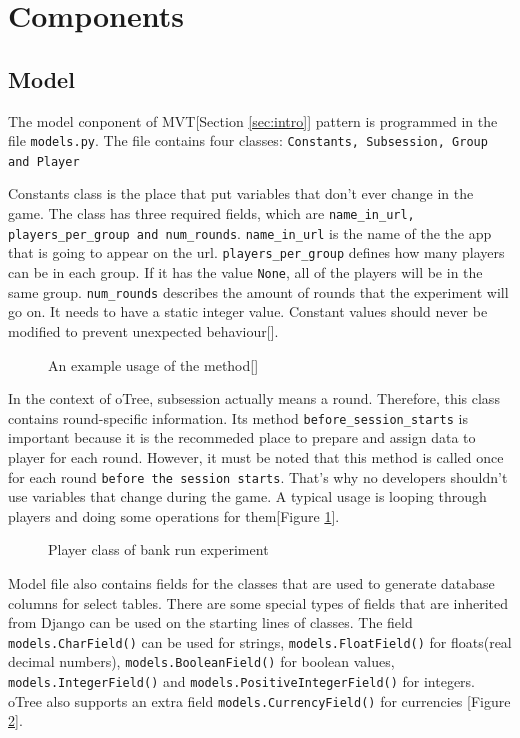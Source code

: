 \section{Components}

\subsection{Model}

The model conponent of MVT[Section \ref{sec:intro}] pattern is programmed in the file \verb|models.py|. The file contains four classes: \verb|Constants, Subsession, Group and Player| 

Constants class is the place that put variables that don't ever change in the game. The class has three required fields, which are \verb|name_in_url, players_per_group and num_rounds|. \verb|name_in_url| is the name of the the app that is going to appear on the url. \verb|players_per_group| defines how many players can be in each group. If it has the value \verb|None|, all of the players will be in the same group. \verb|num_rounds| describes the amount of rounds that the experiment will go on. It needs to have a static integer value. Constant values should never be modified to prevent unexpected behaviour[\cite{oTreeModel2017}]. 

\begin{figure}[h]
	\centerline{}
	\caption{An example usage of the method[\cite{oTreeModel2017}]}
	\label{fig:picture7}
	
\end{figure}

In the context of oTree, subsession actually means a round. Therefore, this class contains round-specific information. Its method \verb|before_session_starts| is important because it is the recommeded place to prepare and assign data to  player for each round. However, it must be noted that this method is called once for each round \verb|before the session starts|. That's why no developers shouldn't use variables that change during the game.  A typical usage is looping through players and doing some operations for them[Figure \ref{fig:picture7}].

\begin{figure}[h]
	\centerline{}
	\caption{Player class of bank run experiment}
	\label{fig:picture8}
\end{figure}

Model file also contains fields for the classes that are used to generate database columns for select tables. There are some special types of fields that are inherited from Django can be used on the starting lines of classes. The field \verb|models.CharField()| can be used for strings, \verb|models.FloatField()| for floats(real decimal numbers), \verb|models.BooleanField()| for boolean values, \verb|models.IntegerField()| and \verb|models.PositiveIntegerField()| for integers. oTree also supports an extra field \verb|models.CurrencyField()| for currencies [Figure \ref{fig:picture8}]. 

